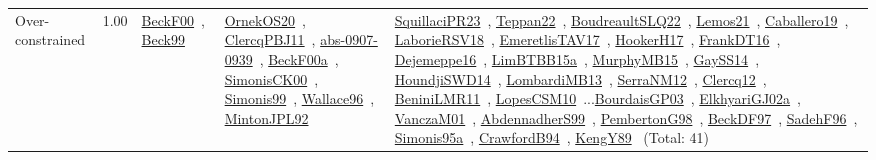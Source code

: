 {\begin{longtable}{p{3cm}r>{\raggedright\arraybackslash}p{6cm}>{\raggedright\arraybackslash}p{6cm}>{\raggedright\arraybackslash}p{8cm}}
\index{Over-constrained}\index{Concepts!Over-constrained}Over-constrained &  1.00 & \href{../works/BeckF00.pdf}{BeckF00}~\cite{BeckF00}, \href{../works/Beck99.pdf}{Beck99}~\cite{Beck99} & \href{../works/OrnekOS20.pdf}{OrnekOS20}~\cite{OrnekOS20}, \href{../works/ClercqPBJ11.pdf}{ClercqPBJ11}~\cite{ClercqPBJ11}, \href{../works/abs-0907-0939.pdf}{abs-0907-0939}~\cite{abs-0907-0939}, \href{../works/BeckF00a.pdf}{BeckF00a}~\cite{BeckF00a}, \href{../works/SimonisCK00.pdf}{SimonisCK00}~\cite{SimonisCK00}, \href{../works/Simonis99.pdf}{Simonis99}~\cite{Simonis99}, \href{../works/Wallace96.pdf}{Wallace96}~\cite{Wallace96}, \href{../works/MintonJPL92.pdf}{MintonJPL92}~\cite{MintonJPL92} & \href{../works/SquillaciPR23.pdf}{SquillaciPR23}~\cite{SquillaciPR23}, \href{../works/Teppan22.pdf}{Teppan22}~\cite{Teppan22}, \href{../works/BoudreaultSLQ22.pdf}{BoudreaultSLQ22}~\cite{BoudreaultSLQ22}, \href{../works/Lemos21.pdf}{Lemos21}~\cite{Lemos21}, \href{../works/Caballero19.pdf}{Caballero19}~\cite{Caballero19}, \href{../works/LaborieRSV18.pdf}{LaborieRSV18}~\cite{LaborieRSV18}, \href{../works/EmeretlisTAV17.pdf}{EmeretlisTAV17}~\cite{EmeretlisTAV17}, \href{../works/HookerH17.pdf}{HookerH17}~\cite{HookerH17}, \href{../works/FrankDT16.pdf}{FrankDT16}~\cite{FrankDT16}, \href{../works/Dejemeppe16.pdf}{Dejemeppe16}~\cite{Dejemeppe16}, \href{../works/LimBTBB15a.pdf}{LimBTBB15a}~\cite{LimBTBB15a}, \href{../works/MurphyMB15.pdf}{MurphyMB15}~\cite{MurphyMB15}, \href{../works/GaySS14.pdf}{GaySS14}~\cite{GaySS14}, \href{../works/HoundjiSWD14.pdf}{HoundjiSWD14}~\cite{HoundjiSWD14}, \href{../works/LombardiMB13.pdf}{LombardiMB13}~\cite{LombardiMB13}, \href{../works/SerraNM12.pdf}{SerraNM12}~\cite{SerraNM12}, \href{../works/Clercq12.pdf}{Clercq12}~\cite{Clercq12}, \href{../works/BeniniLMR11.pdf}{BeniniLMR11}~\cite{BeniniLMR11}, \href{../works/LopesCSM10.pdf}{LopesCSM10}~\cite{LopesCSM10}...\href{../works/BourdaisGP03.pdf}{BourdaisGP03}~\cite{BourdaisGP03}, \href{../works/ElkhyariGJ02a.pdf}{ElkhyariGJ02a}~\cite{ElkhyariGJ02a}, \href{../works/VanczaM01.pdf}{VanczaM01}~\cite{VanczaM01}, \href{../works/AbdennadherS99.pdf}{AbdennadherS99}~\cite{AbdennadherS99}, \href{../works/PembertonG98.pdf}{PembertonG98}~\cite{PembertonG98}, \href{../works/BeckDF97.pdf}{BeckDF97}~\cite{BeckDF97}, \href{../works/SadehF96.pdf}{SadehF96}~\cite{SadehF96}, \href{../works/Simonis95a.pdf}{Simonis95a}~\cite{Simonis95a}, \href{../works/CrawfordB94.pdf}{CrawfordB94}~\cite{CrawfordB94}, \href{../works/KengY89.pdf}{KengY89}~\cite{KengY89} (Total: 41)\\

\end{longtable}}
